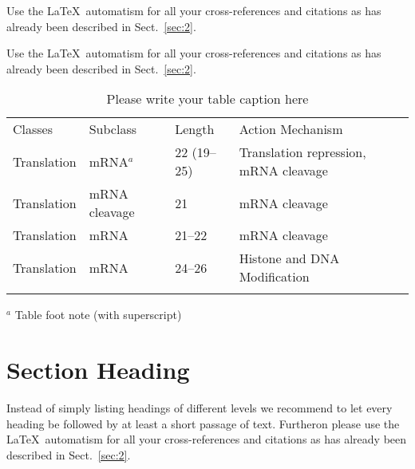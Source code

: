 %
%

 Use the \LaTeX\ automatism for all your cross-references and citations as has already been described in Sect.~\ref{sec:2}.

 Use the \LaTeX\ automatism for all your cross-refer\-ences and citations as has already been described in Sect.~\ref{sec:2}.
%
%
\begin{table}
\caption{Please write your table caption here}
\label{tab:1}       %
%
%
\begin{tabular}{p{2cm}p{2.4cm}p{2cm}p{4.9cm}}
\hline\noalign{\smallskip}
Classes & Subclass & Length & Action Mechanism  \\
\noalign{\smallskip}\svhline\noalign{\smallskip}
Translation & mRNA$^a$  & 22 (19--25) & Translation repression, mRNA cleavage\\
Translation & mRNA cleavage & 21 & mRNA cleavage\\
Translation & mRNA  & 21--22 & mRNA cleavage\\
Translation & mRNA  & 24--26 & Histone and DNA Modification\\
\noalign{\smallskip}\hline\noalign{\smallskip}
\end{tabular}
$^a$ Table foot note (with superscript)
\end{table}
%
\section{Section Heading}
\label{sec:3}
Instead of simply listing headings of different levels we recommend to let every heading be followed by at least a short passage of text. Furtheron please use the \LaTeX\ automatism for all your cross-references and citations as has already been described in Sect.~\ref{sec:2}.

